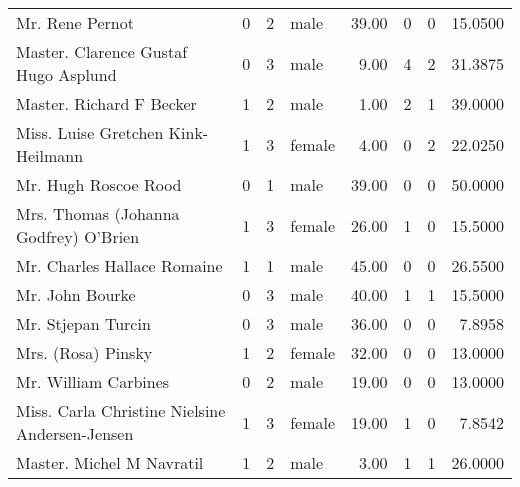 \begin{tabular}{lrrlrrrr}
Mr. Rene Pernot                                    &         0 &       2 &    male &  39.00 &                        0 &                        0 &   15.0500 \\
Master. Clarence Gustaf Hugo Asplund               &         0 &       3 &    male &   9.00 &                        4 &                        2 &   31.3875 \\
Master. Richard F Becker                           &         1 &       2 &    male &   1.00 &                        2 &                        1 &   39.0000 \\
Miss. Luise Gretchen Kink-Heilmann                 &         1 &       3 &  female &   4.00 &                        0 &                        2 &   22.0250 \\
Mr. Hugh Roscoe Rood                               &         0 &       1 &    male &  39.00 &                        0 &                        0 &   50.0000 \\
Mrs. Thomas (Johanna Godfrey) O'Brien              &         1 &       3 &  female &  26.00 &                        1 &                        0 &   15.5000 \\
Mr. Charles Hallace Romaine                        &         1 &       1 &    male &  45.00 &                        0 &                        0 &   26.5500 \\
Mr. John Bourke                                    &         0 &       3 &    male &  40.00 &                        1 &                        1 &   15.5000 \\
Mr. Stjepan Turcin                                 &         0 &       3 &    male &  36.00 &                        0 &                        0 &    7.8958 \\
Mrs. (Rosa) Pinsky                                 &         1 &       2 &  female &  32.00 &                        0 &                        0 &   13.0000 \\
Mr. William Carbines                               &         0 &       2 &    male &  19.00 &                        0 &                        0 &   13.0000 \\
Miss. Carla Christine Nielsine Andersen-Jensen     &         1 &       3 &  female &  19.00 &                        1 &                        0 &    7.8542 \\
Master. Michel M Navratil                          &         1 &       2 &    male &   3.00 &                        1 &                        1 &   26.0000 \\

\end{tabular}
